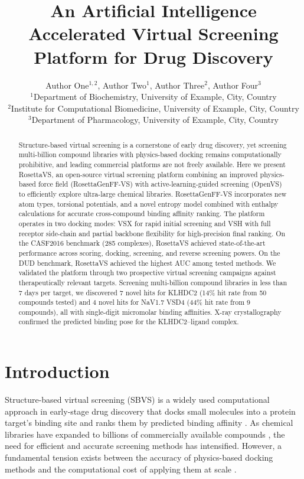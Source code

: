 \documentclass[12pt]{article}
\title{An Artificial Intelligence Accelerated Virtual Screening Platform for Drug Discovery}
\author{Author One$^{1,2}$, Author Two$^{1}$, Author Three$^{2}$, Author Four$^{3}$ \\
\small $^{1}$Department of Biochemistry, University of Example, City, Country \\
\small $^{2}$Institute for Computational Biomedicine, University of Example, City, Country \\
\small $^{3}$Department of Pharmacology, University of Example, City, Country}
\date{}
\begin{document}
\maketitle

\begin{abstract}
Structure-based virtual screening is a cornerstone of early drug discovery, yet screening multi-billion compound libraries with physics-based docking remains computationally prohibitive, and leading commercial platforms are not freely available. Here we present RosettaVS, an open-source virtual screening platform combining an improved physics-based force field (RosettaGenFF-VS) with active-learning-guided screening (OpenVS) to efficiently explore ultra-large chemical libraries. RosettaGenFF-VS incorporates new atom types, torsional potentials, and a novel entropy model combined with enthalpy calculations for accurate cross-compound binding affinity ranking. The platform operates in two docking modes: VSX for rapid initial screening and VSH with full receptor side-chain and partial backbone flexibility for high-precision final ranking. On the CASF2016 benchmark (285 complexes), RosettaVS achieved state-of-the-art performance across scoring, docking, screening, and reverse screening powers. On the DUD benchmark, RosettaVS achieved the highest AUC among tested methods. We validated the platform through two prospective virtual screening campaigns against therapeutically relevant targets. Screening multi-billion compound libraries in less than 7 days per target, we discovered 7 novel hits for KLHDC2 (14\% hit rate from 50 compounds tested) and 4 novel hits for NaV1.7 VSD4 (44\% hit rate from 9 compounds), all with single-digit micromolar binding affinities. X-ray crystallography confirmed the predicted binding pose for the KLHDC2--ligand complex.
\end{abstract}

\section{Introduction}

Structure-based virtual screening (SBVS) is a widely used computational approach in early-stage drug discovery that docks small molecules into a protein target's binding site and ranks them by predicted binding affinity \citep{shoichet2004, walters2005}. As chemical libraries have expanded to billions of commercially available compounds \citep{enamine2023, lyu2019}, the need for efficient and accurate screening methods has intensified. However, a fundamental tension exists between the accuracy of physics-based docking methods and the computational cost of applying them at scale \citep{mcgann2011, friesner2004}.
\end{document}
